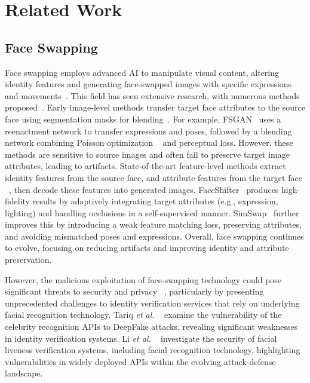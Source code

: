 \section{Related Work}

\subsection{Face Swapping}
Face swapping employs advanced AI to manipulate visual content, altering identity features and generating face-swapped images with specific expressions and movements~\cite{mirsky2021creation}. This field has seen extensive research, with numerous methods proposed~\cite{tolosana2020deepfakes}. Early image-level methods transfer target face attributes to the source face using segmentation masks for blending~\cite{nirkin2018face}. For example, FSGAN~\cite{nirkin2019fsgan} uses a reenactment network to transfer expressions and poses, followed by a blending network combining Poisson optimization ~\cite{perez2003poisson} and perceptual loss. However, these methods are sensitive to source images and often fail to preserve target image attributes, leading to artifacts. 
State-of-the-art feature-level methods extract identity features from the source face, and attribute features from the target face ~\cite{bao2018IPGAN,chen2020simswap}, then decode these features into generated images. FaceShifter~\cite{li2019FaceShifter} produces high-fidelity results by adaptively integrating target attributes (e.g., expression, lighting) and handling occlusions in a self-supervised manner. SimSwap~\cite{chen2020simswap} further improves this by introducing a weak feature matching loss, preserving attributes, and avoiding mismatched poses and expressions. Overall, face swapping continues to evolve, focusing on reducing artifacts and improving identity and attribute preservation.

However, the malicious exploitation of face-swapping technology could pose significant threats to security and privacy ~\cite{tan2024rethinking}, particularly by presenting unprecedented challenges to identity verification services that rely on underlying facial recognition technology.
Tariq \textit{et al.} ~\cite{tariq2022real} examine the vulnerability of the celebrity recognition APIs to DeepFake attacks, revealing significant weaknesses in identity verification systems.
Li \textit{et al.} ~\cite{li2022seeing} investigate the security of facial liveness verification systems, including facial recognition technology, highlighting vulnerabilities in widely deployed APIs within the evolving attack-defense landscape.

